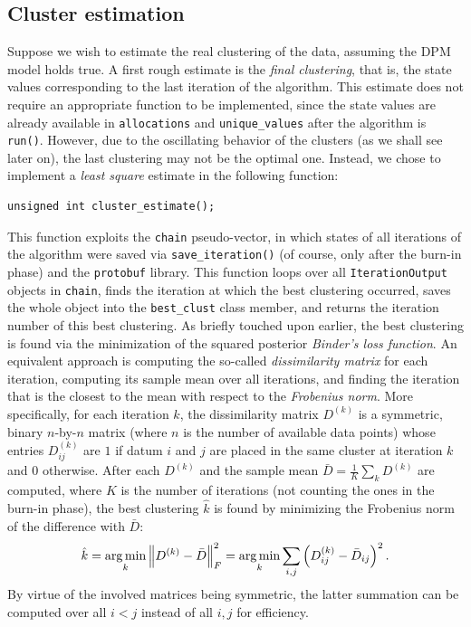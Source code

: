 \subsection{Cluster estimation}
Suppose we wish to estimate the real clustering of the data, assuming the DPM model holds true.
A first rough estimate is the \emph{final clustering}, that is, the state values corresponding to the last iteration of the algorithm.
This estimate does not require an appropriate function to be implemented, since the state values are already available in \verb|allocations| and \verb|unique_values| after the algorithm is \verb|run()|.
However, due to the oscillating behavior of the clusters (as we shall see later on), the last clustering may not be the optimal one.
Instead, we chose to implement a \emph{least square} estimate in the following function:
\begin{verbatim}
unsigned int cluster_estimate();
\end{verbatim}
This function exploits the \verb|chain| pseudo-vector, in which states of all iterations of the algorithm were saved via \verb|save_iteration()| (of course, only after the burn-in phase) and the \verb|protobuf| library.
This function loops over all \verb|IterationOutput| objects in \verb|chain|, finds the iteration at which the best clustering occurred, saves the whole object into the \verb|best_clust| class member, and returns the iteration number of this best clustering.
As briefly touched upon earlier, the best clustering is found via the minimization of the squared posterior \emph{Binder's loss function}.
An equivalent approach is computing the so-called \emph{dissimilarity matrix} for each iteration, computing its sample mean over all iterations, and finding the iteration that is the closest to the mean with respect to the \emph{Frobenius norm}. 
More specifically, for each iteration $k$, the dissimilarity matrix $D^{(k)}$ is a symmetric, binary $n$-by-$n$ matrix (where $n$ is the number of available data points) whose entries $D^{(k)}_{ij}$ are $1$ if datum $i$ and $j$ are placed in the same cluster at iteration $k$ and $0$ otherwise.
After each $D^{(k)}$ and the sample mean $\bar{D} = \frac{1}{K} \sum_k D^{(k)}$ are computed, where $K$ is the number of iterations (not counting the ones in the burn-in phase), the best clustering $\hat{k}$ is found by minimizing the Frobenius norm of the difference with $\bar{D}$:
$$
\hat{k} = \operatorname*{arg\,min}_k \left\lVert D^{(k)} - \bar D \right\rVert_F^2 = \operatorname*{arg\,min}_k \sum_{i,j} \left( D^{(k)}_{ij} - \bar{D}_{ij} \right)^2.
$$
By virtue of the involved matrices being symmetric, the latter summation can be computed over all $i<j$ instead of all $i,j$ for efficiency.

